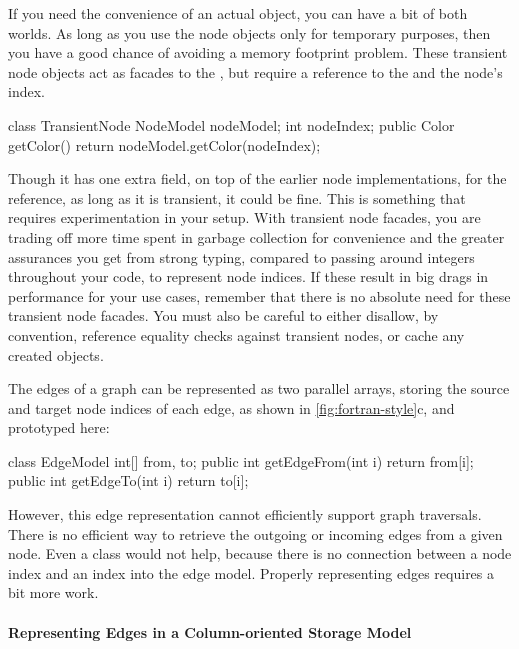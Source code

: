If you need the convenience of an actual  object, you can have a
bit of both worlds. As long as you use the node objects
only for temporary purposes, then you have a good chance of avoiding a memory
footprint problem. These transient node objects act as facades to the
, but require a reference to the  and the
node's index. 
\begin{shortlisting}
class TransientNode {
   NodeModel nodeModel;
   int nodeIndex;
   public Color getColor() {
      return nodeModel.getColor(nodeIndex);
   }
}
\end{shortlisting}
Though it has one extra field, on top of the earlier node implementations, for
the  reference, as long as it is transient, it could be fine.
This is something that requires experimentation in your setup. With transient
node facades, you are trading off more time spent in garbage collection for
convenience and the greater assurances you get from strong typing, compared to
passing around integers throughout your code, to represent node indices.
If these result in big drags in performance for your use cases, remember
that there is no absolute need for these transient node facades. You must also
be careful to either disallow, by convention, reference equality checks against
transient nodes, or cache any created objects.

The edges of a graph can be represented as two parallel arrays, storing the
source and target node indices of each edge, as shown in
\autoref{fig:fortran-style}c, and prototyped here:
\begin{shortlisting}
class EdgeModel {
   int[] from, to;
   public int getEdgeFrom(int i) {
      return from[i];
   }
   public int getEdgeTo(int i) {
      return to[i];
   }
}
\end{shortlisting}
However, this edge representation cannot efficiently support graph
traversals. There is no efficient way to retrieve the outgoing or
incoming edges from a given node. Even a  class would not
help, because there is no connection between a node index and an index
into the edge model. Properly representing edges requires a bit more work. 

\paragraph{Representing Edges in a Column-oriented Storage Model}


